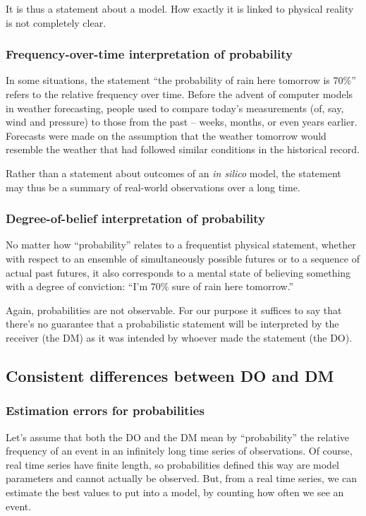 \documentclass[a4paper, 12pt]{article}
\newcommand{\seclabel}[1]{\label{sec:#1}}
\begin{document}
It is thus a statement about a model. How exactly it is linked to physical reality is not completely clear.

\subsubsection*{Frequency-over-time interpretation of probability}
In some situations, the statement ``the probability of rain here tomorrow is 70\%'' refers to the relative frequency over time. Before the advent of computer models in weather forecasting, people used to compare today's measurements (of, say, wind and pressure) to those from the past -- weeks, months, or even years earlier. Forecasts were made on the assumption that the weather tomorrow would resemble the weather that had followed similar conditions in the historical record.

Rather than a statement about outcomes of an \textit{in silico} model, the statement may thus be a summary of real-world observations over a long time.

\subsubsection*{Degree-of-belief interpretation of probability}
No matter how ``probability'' relates to a frequentist physical statement, whether with respect to an ensemble of simultaneously possible futures or to a sequence of actual past futures, it also corresponds to a mental state of believing something with a degree of conviction: 
``I'm 70\% sure of rain here tomorrow.''

Again, probabilities are not observable.
For our purpose it suffices to say that there's no guarantee that a probabilistic statement will be interpreted by the receiver (the DM) as it was intended by whoever made the statement (the DO).

\subsection{Consistent differences between DO and DM \seclabel{condition2}}

\subsubsection*{Estimation errors for probabilities}
Let's assume that both the DO and the DM mean by ``probability'' the relative frequency of an event in an infinitely long time series of observations. Of course, real time series have finite length, so probabilities defined this way are model parameters and cannot actually be observed. But, from a real time series, we can estimate the best values to put into a model, by counting how often we see an event.
\end{document}
